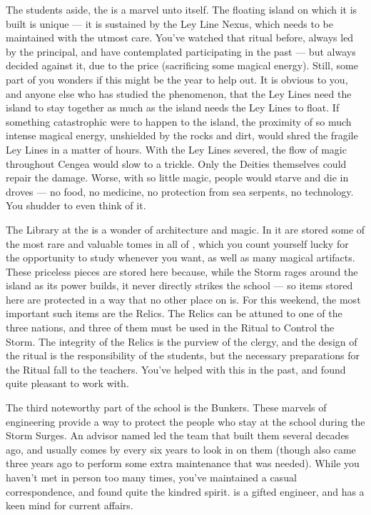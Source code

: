 \documentclass[char]{GL2020}
\begin{document}
The students aside, the \pSc{} is a marvel unto itself. The floating island on which it is built is unique — it is sustained by the Ley Line Nexus, which needs to be maintained with the utmost care. You've watched that ritual before, always led by the principal, and have contemplated participating in the past — but always decided against it, due to the price (sacrificing some magical energy). Still, some part of you wonders if this might be the year to help out. It is obvious to you, and anyone else who has studied the phenomenon, that the Ley Lines need the island to stay together as much as the island needs the Ley Lines to float. If something catastrophic were to happen to the island, the proximity of so much intense magical energy, unshielded by the rocks and dirt, would shred the fragile Ley Lines in a matter of hours. With the Ley Lines severed, the flow of magic throughout Cengea would slow to a trickle. Only the Deities themselves could repair the damage. Worse, with so little magic, people would starve and die in droves — no food, no medicine, no protection from sea serpents, no technology. You shudder to even think of it.

The Library at the \pSc{} is a wonder of architecture and magic. In it are stored some of the most rare and valuable tomes in all of \pEarth{}, which you count yourself lucky for the opportunity to study whenever you want, as well as many magical artifacts. These priceless pieces are stored here because, while the Storm rages around the island as its power builds, it never directly strikes the school — so items stored here are protected in a way that no other place on \pEarth{} is. For this weekend, the most important such items are the Relics. The Relics can be attuned to one of the three nations, and three of them must be used in the Ritual to Control the Storm. The integrity of the Relics is the purview of the clergy, and the design of the ritual is the responsibility of the students, but the necessary preparations for the Ritual fall to the teachers. You've helped \cLibrarian{\intro} with this in the past, and found \cLibrarian{\them} quite pleasant to work with.

The third noteworthy part of the school is the Bunkers. These marvels of engineering provide a way to protect the people who stay at the school during the Storm Surges. An advisor named \cBunker{\intro} led the team that built them several decades ago, and usually comes by every six years to look in on them (though \cBunker{\they} also came three years ago to perform some extra maintenance that was needed). While you haven't met \cBunker{\them} in person too many times, you've maintained a casual correspondence, and found quite the kindred spirit. \cBunker{} is a gifted engineer, and has a keen mind for current affairs.
\end{document}
